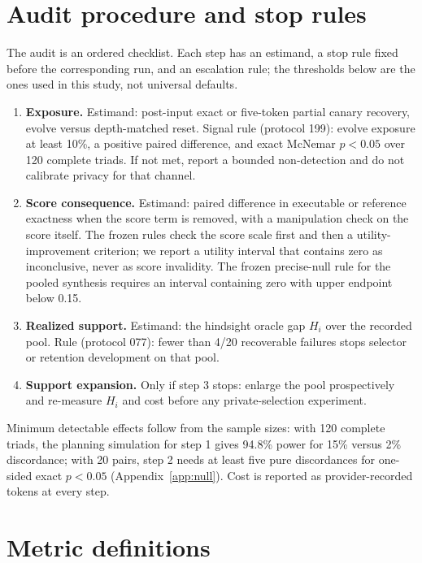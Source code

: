 \section{Audit procedure and stop rules}
\label{app:procedure}

The audit is an ordered checklist. Each step has an estimand, a stop rule fixed before the corresponding run, and an escalation rule; the thresholds below are the ones used in this study, not universal defaults.

\begin{enumerate}
  \setlength{\itemsep}{1pt}
  \item \textbf{Exposure.} Estimand: post-input exact or five-token partial canary recovery, evolve versus depth-matched reset. Signal rule (protocol 199): evolve exposure at least 10\%, a positive paired difference, and exact McNemar $p<0.05$ over 120 complete triads. If not met, report a bounded non-detection and do not calibrate privacy for that channel.
  \item \textbf{Score consequence.} Estimand: paired difference in executable or reference exactness when the score term is removed, with a manipulation check on the score itself. The frozen rules check the score scale first and then a utility-improvement criterion; we report a utility interval that contains zero as inconclusive, never as score invalidity. The frozen precise-null rule for the pooled synthesis requires an interval containing zero with upper endpoint below 0.15.
  \item \textbf{Realized support.} Estimand: the hindsight oracle gap $H_i$ over the recorded pool. Rule (protocol 077): fewer than 4/20 recoverable failures stops selector or retention development on that pool.
  \item \textbf{Support expansion.} Only if step 3 stops: enlarge the pool prospectively and re-measure $H_i$ and cost before any private-selection experiment.
\end{enumerate}

Minimum detectable effects follow from the sample sizes: with 120 complete triads, the planning simulation for step 1 gives 94.8\% power for 15\% versus 2\% discordance; with 20 pairs, step 2 needs at least five pure discordances for one-sided exact $p<0.05$ (Appendix~\ref{app:null}). Cost is reported as provider-recorded tokens at every step.

\section{Metric definitions}
\label{app:metrics}

